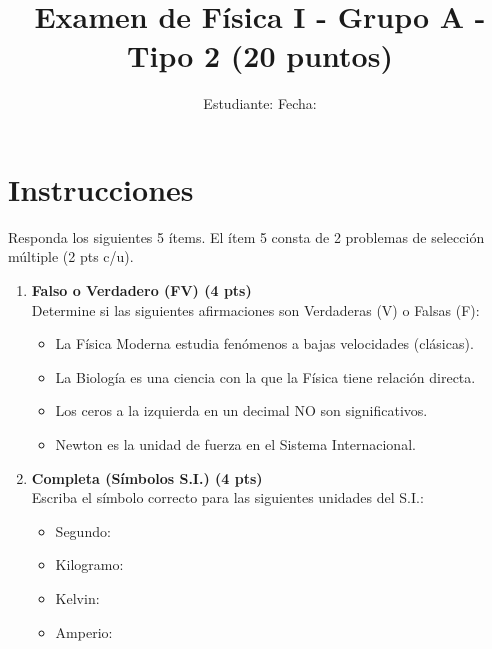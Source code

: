 \documentclass[a4paper,12pt]{article}
\title{Examen de Física I - Grupo A - Tipo 2 (20 puntos)}
\author{Estudiante: \underline{\hspace{6cm}} \quad Fecha: \underline{\hspace{3cm}}}
\date{}
\begin{document}
\maketitle

\section*{Instrucciones}
Responda los siguientes 5 ítems. El ítem 5 consta de 2 problemas de selección múltiple (2 pts c/u).

\begin{enumerate}[label=\textbf{Item \arabic*:}, leftmargin=*]

    \item \textbf{Falso o Verdadero (FV) (4 pts)} \\
    Determine si las siguientes afirmaciones son Verdaderas (V) o Falsas (F):
    \begin{itemize}
        \item[\underline{\hspace{1cm}}] La Física Moderna estudia fenómenos a bajas velocidades (clásicas).
        \item[\underline{\hspace{1cm}}] La Biología es una ciencia con la que la Física tiene relación directa.
        \item[\underline{\hspace{1cm}}] Los ceros a la izquierda en un decimal NO son significativos.
        \item[\underline{\hspace{1cm}}] Newton es la unidad de fuerza en el Sistema Internacional.
    \end{itemize}

    \item \textbf{Completa (Símbolos S.I.) (4 pts)} \\
    Escriba el símbolo correcto para las siguientes unidades del S.I.:
    \begin{itemize}
        \item Segundo: \underline{\hspace{4cm}}
        \item Kilogramo: \underline{\hspace{4cm}}
        \item Kelvin: \underline{\hspace{4cm}}
        \item Amperio: \underline{\hspace{4cm}}
    \end{itemize}


\end{enumerate}
\end{document}
